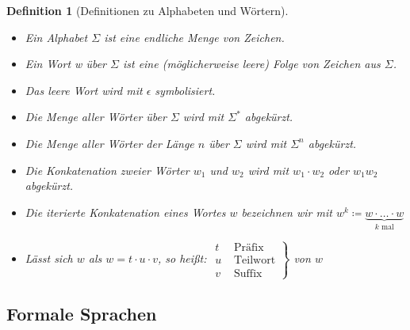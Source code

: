 \documentclass[11pt]{scrartcl}
\theoremstyle{break}
\newtheorem{defi}[satz]{Definition}
\begin{document}
    \begin{defi}[Definitionen zu Alphabeten und Wörtern]
        \begin{itemize}
            \item Ein Alphabet $\Sigma$ ist eine endliche Menge von Zeichen.
            \item Ein Wort w über $\Sigma$ ist eine (möglicherweise leere) Folge von Zeichen aus $\Sigma$.
            \item Das leere Wort wird mit $\epsilon$ symbolisiert.
            \item Die Menge aller Wörter über $\Sigma$ wird mit $\Sigma^*$ abgekürzt.
            \item Die Menge aller Wörter der Länge $n$ über $\Sigma$ wird mit $\Sigma^n$ abgekürzt.
            \item Die Konkatenation zweier Wörter $w_1$ und $w_2$ wird mit $w_1\cdot w_2$ oder $w_{1}w_{2}$ abgekürzt.
            \item Die iterierte Konkatenation eines Wortes $w$ bezeichnen wir mit $w^k\coloneqq \underbrace{w\cdot\dots\cdot w}_{k\text{ mal}}$
            \item Lässt sich $w$ als $w=t\cdot u\cdot v$, so heißt:
            $\left. \begin{array}{cc}
                        t &\text{ Präfix}\\
                        u &\text{ Teilwort}\\
                        v &\text{ Suffix}
            \end{array} \right\}$
            von $w$
        \end{itemize}
    \end{defi}


    \subsection{Formale Sprachen}
	\label{subsec:formale-sprachenindex}
\end{document}
